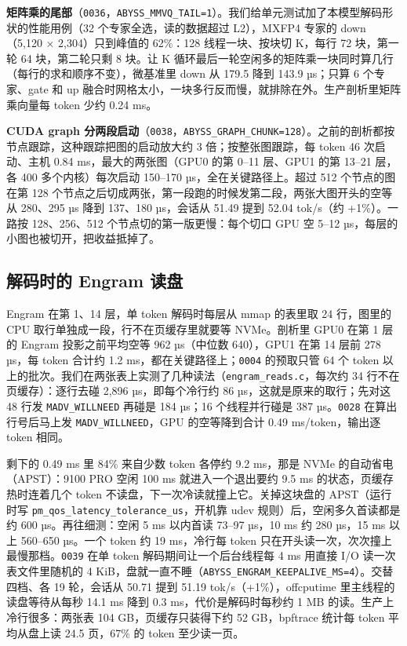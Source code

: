 \documentclass[11pt,a4paper]{article}
\newcommand{\code}[1]{\texttt{#1}}
\newcommand{\tps}{tok/s}
\begin{document}
\textbf{矩阵乘的尾部}（\code{0036}，\code{ABYSS\_MMVQ\_TAIL=1}）。我们给单元测试加了本模型解码形状的性能用例（32 个专家全选，读的数据超过 L2），MXFP4 专家的 down（5,120 × 2,304）只到峰值的 62\%：128 线程一块、按块切 K，每行 72 块，第一轮 64 块，第二轮只剩 8 块。让 K 循环最后一轮空闲多的矩阵乘一块同时算几行（每行的求和顺序不变），微基准里 down 从 179.5 降到 143.9 µs；只算 6 个专家、gate 和 up 融合时网格太小，一块多行反而慢，就排除在外。生产剖析里矩阵乘向量每 token 少约 0.24 ms。

\textbf{CUDA graph 分两段启动}（\code{0038}，\code{ABYSS\_GRAPH\_CHUNK=128}）。之前的剖析都按节点跟踪，这种跟踪把图的启动放大约 3 倍；按整张图跟踪，每 token 46 次启动、主机 0.84 ms，最大的两张图（GPU0 的第 0--11 层、GPU1 的第 13--21 层，各 400 多个内核）每次启动 150--170 µs，全在关键路径上。超过 512 个节点的图在第 128 个节点之后切成两张，第一段跑的时候发第二段，两张大图开头的空等从 280、295 µs 降到 137、180 µs，会话从 51.49 提到 52.04 \tps{}（约 +1\%）。一路按 128、256、512 个节点切的第一版更慢：每个切口 GPU 空 5--12 µs，每层的小图也被切开，把收益抵掉了。

\subsection{解码时的 Engram 读盘}
\label{sec:engramdecode}

Engram 在第 1、14 层，单 token 解码时每层从 mmap 的表里取 24 行，图里的 CPU 取行单独成一段，行不在页缓存里就要等 NVMe。剖析里 GPU0 在第 1 层的 Engram 投影之前平均空等 962 µs（中位数 640），GPU1 在第 14 层前 278 µs，每 token 合计约 1.2 ms，都在关键路径上；\code{0004} 的预取只管 64 个 token 以上的批次。我们在两张表上实测了几种读法（\code{engram\_reads.c}，每次约 34 行不在页缓存）：逐行去碰 2,896 µs，即每个冷行约 86 µs，这就是原来的取行；先对这 48 行发 \code{MADV\_WILLNEED} 再碰是 184 µs；16 个线程并行碰是 387 µs。\code{0028} 在算出行号后马上发 \code{MADV\_WILLNEED}，GPU 的空等降到合计 0.49 ms/token，输出逐 token 相同。

剩下的 0.49 ms 里 84\% 来自少数 token 各停约 9.2 ms，那是 NVMe 的自动省电（APST）：9100 PRO 空闲 100 ms 就进入一个退出要约 9.5 ms 的状态，页缓存热时连着几个 token 不读盘，下一次冷读就撞上它。关掉这块盘的 APST（运行时写 \code{pm\_qos\_latency\_tolerance\_us}，开机靠 udev 规则）后，空闲多久首读都是约 600 µs。再往细测：空闲 5 ms 以内首读 73--97 µs，10 ms 约 280 µs，15 ms 以上 560--650 µs。一个 token 约 19 ms，冷行每 token 只在开头读一次，次次撞上最慢那档。\code{0039} 在单 token 解码期间让一个后台线程每 4 ms 用直接 I/O 读一次表文件里随机的 4 KiB，盘就一直不睡（\code{ABYSS\_ENGRAM\_KEEPALIVE\_MS=4}）。交替四档、各 19 轮，会话从 50.71 提到 51.19 \tps{}（+1\%），offcputime 里主线程的读盘等待从每秒 14.1 ms 降到 0.3 ms，代价是解码时每秒约 1 MB 的读。生产上冷行很多：两张表 104 GB，页缓存只装得下约 52 GB，bpftrace 统计每 token 平均从盘上读 24.5 页，67\% 的 token 至少读一页。
\end{document}
